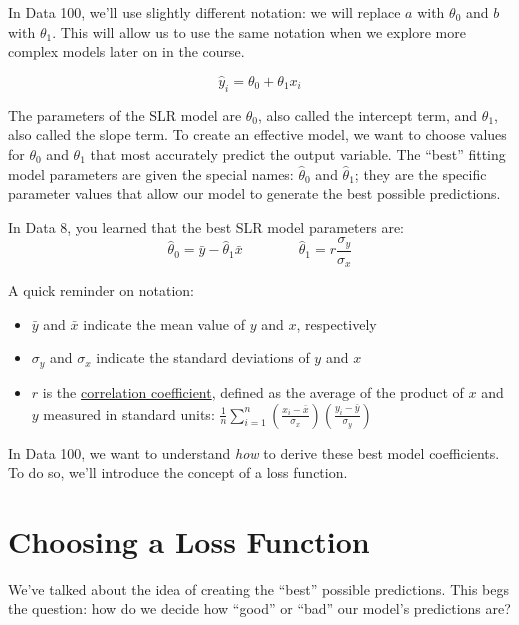 \documentclass[
  letterpaper,
  DIV=11,
  numbers=noendperiod]{scrreprt}
\providecommand{\tightlist}{%
  \setlength{\itemsep}{0pt}\setlength{\parskip}{0pt}}\usepackage{longtable,booktabs,array}
\begin{document}
In Data 100, we'll use slightly different notation: we will replace
\(a\) with \(\theta_0\) and \(b\) with \(\theta_1\). This will allow us
to use the same notation when we explore more complex models later on in
the course.

\[\hat{y}_i = \theta_0 + \theta_1 x_i\]

The parameters of the SLR model are \(\theta_0\), also called the
intercept term, and \(\theta_1\), also called the slope term. To create
an effective model, we want to choose values for \(\theta_0\) and
\(\theta_1\) that most accurately predict the output variable. The
``best'' fitting model parameters are given the special names:
\(\hat{\theta}_0\) and \(\hat{\theta}_1\); they are the specific
parameter values that allow our model to generate the best possible
predictions.

In Data 8, you learned that the best SLR model parameters are:
\[\hat{\theta}_0 = \bar{y} - \hat{\theta}_1\bar{x} \qquad \qquad \hat{\theta}_1 = r \frac{\sigma_y}{\sigma_x}\]

A quick reminder on notation:

\begin{itemize}
\tightlist
\item
  \(\bar{y}\) and \(\bar{x}\) indicate the mean value of \(y\) and
  \(x\), respectively
\item
  \(\sigma_y\) and \(\sigma_x\) indicate the standard deviations of
  \(y\) and \(x\)
\item
  \(r\) is the
  \href{https://inferentialthinking.com/chapters/15/1/Correlation.html\#the-correlation-coefficient}{correlation
  coefficient}, defined as the average of the product of \(x\) and \(y\)
  measured in standard units:
  \(\frac{1}{n} \sum_{i=1}^n (\frac{x_i-\bar{x}}{\sigma_x})(\frac{y_i-\bar{y}}{\sigma_y})\)
\end{itemize}

In Data 100, we want to understand \emph{how} to derive these best model
coefficients. To do so, we'll introduce the concept of a loss function.

\section{Choosing a Loss Function}\label{choosing-a-loss-function}

We've talked about the idea of creating the ``best'' possible
predictions. This begs the question: how do we decide how ``good'' or
``bad'' our model's predictions are?
\end{document}

